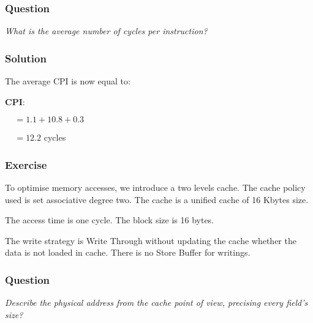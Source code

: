 
\begin{frame}
  \frametitle{Question}

  \textit{What is the average number of cycles per instruction?}
\end{frame}


\begin{frame}
  \frametitle{Solution}

  The average CPI is now equal to:

  \nl

  \textbf{CPI}:

  $~~~~~= 1.1 + 10.8 + 0.3$

  $~~~~~= 12.2$ cycles
\end{frame}


\begin{frame}
  \frametitle{Exercise}

  To optimise memory accesses, we introduce a two levels cache. The
  cache policy used is set associative degree two. The cache is a
  unified cache of 16 Kbytes size.

  \nl

  The access time is one cycle. The block size is 16 bytes.

  \nl

  The write strategy is Write Through without updating the cache whether
  the data is not loaded in cache. There is no Store Buffer for writings.
\end{frame}


\begin{frame}
  \frametitle{Question}

  \textit{Describe the physical address from the cache point of view,
    precising every field's size?}
\end{frame}



